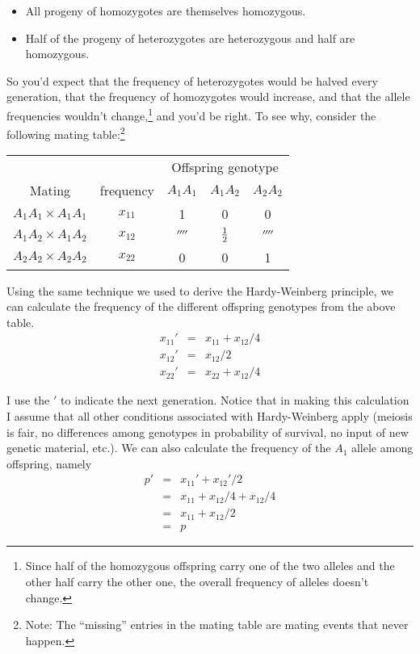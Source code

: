 \begin{itemize}

\item All progeny of homozygotes are themselves homozygous.

\item Half of the progeny of heterozygotes are heterozygous and half
are homozygous.

\end{itemize}
So you'd expect that the frequency of heterozygotes would be halved
every generation, that the frequency of homozygotes would increase,
and that the allele frequencies wouldn't change,\footnote{Since half
  of the homozygous offspring carry one of the two alleles and the
  other half carry the other one, the overall frequency of alleles
  doesn't change.} and you'd be right. To see why, consider the
following mating table:\footnote{Note: The ``missing'' entries in the
  mating table are mating events that never happen.}

\begin{center}
\begin{tabular}{ccccc}
\hline\hline
&&\multicolumn{3}{c}{Offspring genotype} \\
Mating & frequency & $A_1A_1$ & $A_1A_2$ & $A_2A_2$ \\
\hline
$A_1A_1 \times A_1A_1$ & $x_{11}$ & 1 & 0 & 0 \\
$A_1A_2 \times A_1A_2$ & $x_{12}$ & $\fourth$ & $\frac{1}{2}$ & $\fourth$ \\
$A_2A_2 \times A_2A_2$ & $x_{22}$ & 0 & 0 & 1 \\
\hline
\end{tabular}
\end{center}

\noindent Using the same technique we used to derive the
Hardy-Weinberg principle, we can calculate the frequency of the
different offspring genotypes from the above table.
\begin{eqnarray}
x_{11}' &=& x_{11} + x_{12}/4 \\
x_{12}' &=& x_{12}/2 \\
x_{22}' &=& x_{22} + x_{12}/4
\end{eqnarray}

\noindent I use the $'$ to indicate the next generation. Notice that
in making this calculation I assume that all other conditions
associated with Hardy-Weinberg apply (meiosis is fair, no differences
among genotypes in probability of survival, no input of new genetic
material, etc.). We can also calculate the frequency of the $A_1$
allele among offspring, namely
\begin{eqnarray}
p' &=& x_{11}' + x_{12}'/2 \\
   &=& x_{11} + x_{12}/4 + x_{12} /4 \\
   &=& x_{11} + x_{12}/2 \\
   &=& p
\end{eqnarray}

